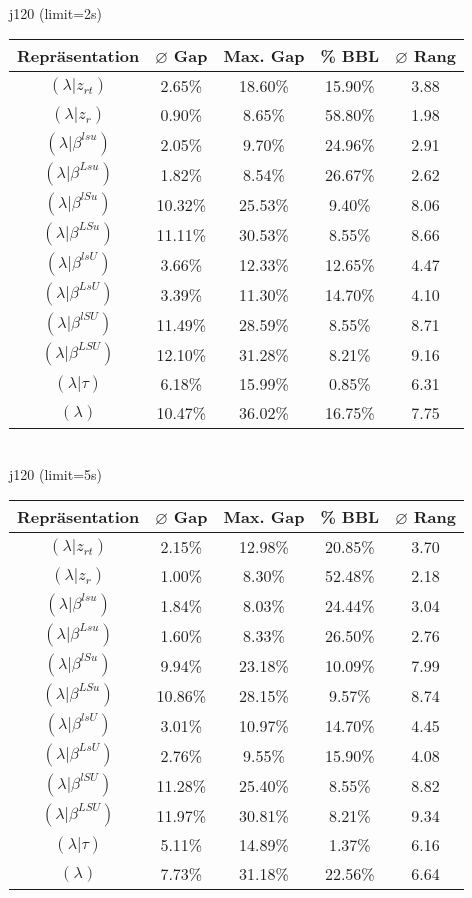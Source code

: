\documentclass{scrartcl}
\begin{document}
\\[8pt]j120 (limit=2s)\\\begin{tabular}{ccccc}
\hline
Repräsentation & $\varnothing$ Gap & Max. Gap & \% BBL & $\varnothing$ Rang\\[3pt]
\hline
$(\lambda|z_{rt})$&2.65\%&18.60\%&15.90\%&3.88\\
\hline
$(\lambda|z_r)$&0.90\%&8.65\%&58.80\%&1.98\\
\hline
$(\lambda|\beta^{lsu})$&2.05\%&9.70\%&24.96\%&2.91\\
\hline
$(\lambda|\beta^{Lsu})$&1.82\%&8.54\%&26.67\%&2.62\\
\hline
$(\lambda|\beta^{lSu})$&10.32\%&25.53\%&9.40\%&8.06\\
\hline
$(\lambda|\beta^{LSu})$&11.11\%&30.53\%&8.55\%&8.66\\
\hline
$(\lambda|\beta^{lsU})$&3.66\%&12.33\%&12.65\%&4.47\\
\hline
$(\lambda|\beta^{LsU})$&3.39\%&11.30\%&14.70\%&4.10\\
\hline
$(\lambda|\beta^{lSU})$&11.49\%&28.59\%&8.55\%&8.71\\
\hline
$(\lambda|\beta^{LSU})$&12.10\%&31.28\%&8.21\%&9.16\\
\hline
$(\lambda|\tau)$&6.18\%&15.99\%&0.85\%&6.31\\
\hline
$(\lambda)$&10.47\%&36.02\%&16.75\%&7.75\\\hline
\end{tabular}
\\[8pt]
\newpage
j120 (limit=5s)\\\begin{tabular}{ccccc}
\hline
Repräsentation & $\varnothing$ Gap & Max. Gap & \% BBL & $\varnothing$ Rang\\[3pt]
\hline
$(\lambda|z_{rt})$&2.15\%&12.98\%&20.85\%&3.70\\
\hline
$(\lambda|z_r)$&1.00\%&8.30\%&52.48\%&2.18\\
\hline
$(\lambda|\beta^{lsu})$&1.84\%&8.03\%&24.44\%&3.04\\
\hline
$(\lambda|\beta^{Lsu})$&1.60\%&8.33\%&26.50\%&2.76\\
\hline
$(\lambda|\beta^{lSu})$&9.94\%&23.18\%&10.09\%&7.99\\
\hline
$(\lambda|\beta^{LSu})$&10.86\%&28.15\%&9.57\%&8.74\\
\hline
$(\lambda|\beta^{lsU})$&3.01\%&10.97\%&14.70\%&4.45\\
\hline
$(\lambda|\beta^{LsU})$&2.76\%&9.55\%&15.90\%&4.08\\
\hline
$(\lambda|\beta^{lSU})$&11.28\%&25.40\%&8.55\%&8.82\\
\hline
$(\lambda|\beta^{LSU})$&11.97\%&30.81\%&8.21\%&9.34\\
\hline
$(\lambda|\tau)$&5.11\%&14.89\%&1.37\%&6.16\\
\hline
$(\lambda)$&7.73\%&31.18\%&22.56\%&6.64\\\hline
\end{tabular}
\end{document}
